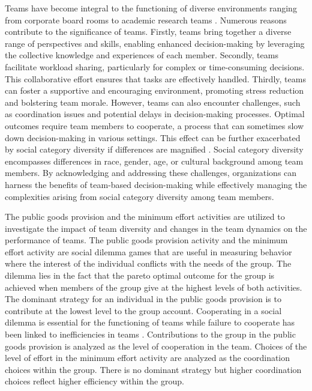 Teams have become integral to the functioning of diverse environments ranging from corporate board rooms to academic research teams \citep{bjl14,lml}. Numerous reasons contribute to the significance of teams. Firstly, teams bring together a diverse range of perspectives and skills, enabling enhanced decision-making by leveraging the collective knowledge and experiences of each member. Secondly, teams facilitate workload sharing, particularly for complex or time-consuming decisions. This collaborative effort ensures that tasks are effectively handled. Thirdly, teams can foster a supportive and encouraging environment, promoting stress reduction and bolstering team morale. However, teams can also encounter challenges, such as coordination issues and potential delays in decision-making processes. Optimal outcomes require team members to cooperate, a process that can sometimes slow down decision-making in various settings. This effect can be further exacerbated by social category diversity if differences are magnified \citep{lau}. Social category diversity encompasses differences in race, gender, age, or cultural background among team members. By acknowledging and addressing these challenges, organizations can harness the benefits of team-based decision-making while effectively managing the complexities arising from social category diversity among team members. 

 
 The public goods provision and the minimum effort activities are utilized to investigate the impact of team diversity and changes in the team dynamics on the performance of teams. The public goods provision activity and the minimum effort activity are social dilemma games that are useful in measuring behavior where the interest of the individual conflicts with the needs of the group. The dilemma lies in the fact that the pareto optimal outcome for the group is achieved when members of the group give at the highest levels of both activities. The dominant strategy for an individual in the public goods provision is to contribute at the lowest level to the group account. Cooperating in a social dilemma is essential for the functioning of teams while failure to cooperate has been linked to inefficiencies in teams \citep{stallen2023}. Contributions to the group in the public goods provision is analyzed as the level of cooperation in the team. Choices of the level of effort in the minimum effort activity are analyzed as the coordination choices within the group.  There is no dominant strategy but higher coordination choices reflect higher efficiency within the group. 
 
